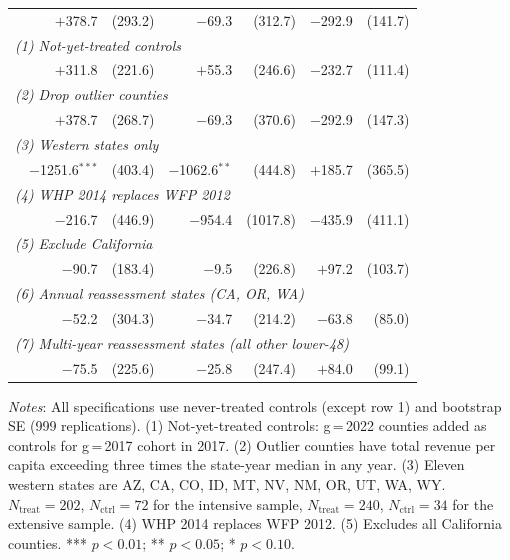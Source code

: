 \documentclass[12pt]{article}
\begin{document}
\begin{table}[h!]
\begin{threeparttable}
\begin{tabular}{lrrrrrr}
 & $+$378.7 & (293.2) & $-$69.3  & (312.7) & $-$292.9 & (141.7) \\
\multicolumn{7}{l}{\textit{(1) Not-yet-treated controls}} \\
 & $+$311.8 & (221.6) & $+$55.3  & (246.6) & $-$232.7 & (111.4) \\
\multicolumn{7}{l}{\textit{(2) Drop outlier counties}} \\
 & $+$378.7 & (268.7) & $-$69.3  & (370.6) & $-$292.9 & (147.3) \\
\multicolumn{7}{l}{\textit{(3) Western states only}} \\
 & $-$1251.6$^{***}$ & (403.4) & $-$1062.6$^{**}$ & (444.8) & $+$185.7 & (365.5) \\
\multicolumn{7}{l}{\textit{(4) WHP 2014 replaces WFP 2012}} \\
 & $-$216.7 & (446.9) & $-$954.4 & (1017.8) & $-$435.9 & (411.1) \\
\multicolumn{7}{l}{\textit{(5) Exclude California}} \\
 & $-$90.7  & (183.4) & $-$9.5   & (226.8) & $+$97.2  & (103.7) \\
\multicolumn{7}{l}{\textit{(6) Annual reassessment states (CA, OR, WA)}} \\
 & $-$52.2 & (304.3) & $-$34.7 & (214.2) & $-$63.8 & (85.0) \\
\multicolumn{7}{l}{\textit{(7) Multi-year reassessment states (all other lower-48)}} \\
 & $-$75.5 & (225.6) & $-$25.8 & (247.4) & $+$84.0 & (99.1) \\
\bottomrule
\end{tabular}
\begin{tablenotes}[flushleft]
\small
\item \textit{Notes}: All specifications use never-treated controls (except row 1) and bootstrap SE (999 replications).
(1) Not-yet-treated controls: g\,=\,2022 counties added
as controls for g\,=\,2017 cohort in 2017. (2) Outlier counties have total revenue per
capita exceeding three times the state-year median in any year. (3) Eleven western states are AZ, CA, CO, ID,
MT, NV, NM, OR, UT, WA, WY. $N_{\text{treat}}=202$, $N_{\text{ctrl}}=72$ for the intensive sample, $N_{\text{treat}}=240$, $N_{\text{ctrl}}=34$ for the extensive sample.
(4) WHP 2014 replaces WFP 2012. (5) Excludes all California counties.  *** $p < 0.01$; ** $p < 0.05$; * $p < 0.10$.
\end{tablenotes}
\end{threeparttable}
\end{table}
\end{document}
